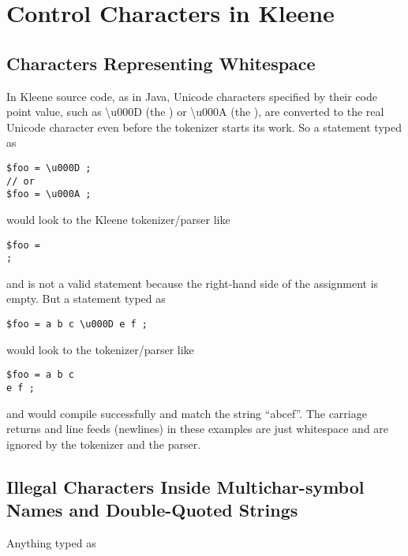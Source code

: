 \chapter{Control Characters in Kleene}

\label{app:controlcharacters}

\section{Characters Representing Whitespace}

In Kleene source code, as in Java, Unicode characters specified by their
code point value, such as \textbackslash{}u000D (the ) or \textbackslash{}u000A (the ), are converted
to the real Unicode character even before the tokenizer starts its work.
So a statement typed as

\begin{Verbatim}[fontsize=\small]
$foo = \u000D ;
// or
$foo = \u000A ;
\end{Verbatim}

\noindent
would look to the Kleene tokenizer/parser like

\begin{Verbatim}[fontsize=\small]
$foo =
;
\end{Verbatim}

\noindent
and is not a valid statement because the right-hand side of the assignment is
empty.  But a statement typed as

\begin{Verbatim}[fontsize=\small]
$foo = a b c \u000D e f ;
\end{Verbatim}

\noindent
would look to the tokenizer/parser like

\begin{Verbatim}[fontsize=\small]
$foo = a b c
e f ;
\end{Verbatim}

\noindent
and would compile successfully and match the string ``abcef''.  The carriage
returns and line feeds (newlines) in these examples are just whitespace and
are ignored by the tokenizer and the parser.

\section{Illegal Characters Inside Multichar-symbol Names and
Double-Quoted Strings}

Anything typed as 

